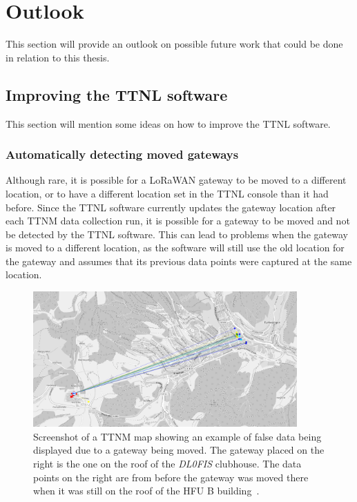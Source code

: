 \section{Outlook}

This section will provide an outlook on possible future work that could be done in relation to this thesis.

\subsection{Improving the \acf{TTNL} software}

This section will mention some ideas on how to improve the \ac{TTNL} software.

\subsubsection{Automatically detecting moved gateways}

Although rare, it is possible for a \ac{LoRaWAN} gateway to be moved to a different location, or to have a different location set in the \ac{TTNL} console than it had before.
Since the \ac{TTNL} software currently updates the gateway location after each \ac{TTNM} data collection run, it is possible for a gateway to be moved and not be detected by the \ac{TTNL} software.
This can lead to problems when the gateway is moved to a different location, as the software will still use the old location for the gateway and assumes that its previous data points were captured at the same location.

\begin{figure}[htbp]
    \centering
    \includegraphics[width=0.9\textwidth]{pictures/ttn-mapper/moved_gateway_example.png}
    \caption{
        Screenshot of a \ac{TTNM} map showing an example of false data being displayed due to a gateway being moved.
        The gateway placed on the right is the one on the roof of the \emph{DL0FIS} clubhouse.
        The data points on the right are from before the gateway was moved there when it was still on the roof of the \ac{HFU} B building~\cite{ttn_mapper_ttn_2023}.
    }\label{pic:gateway-moved-example}
\end{figure}

